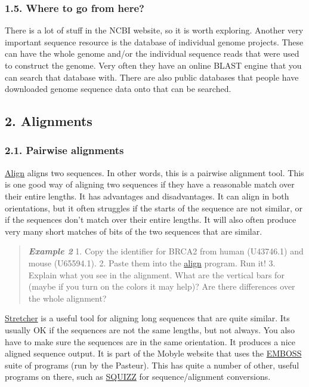 \documentclass[]{article}
\begin{document}
\subsubsection{1.5. Where to go from here?}\label{where-to-go-from-here}

There is a lot of stuff in the NCBI website, so it is worth exploring.
Another very important sequence resource is the database of individual
genome projects. These can have the whole genome and/or the individual
sequence reads that were used to construct the genome. Very often they
have an online BLAST engine that you can search that database with.
There are also public databases that people have downloaded genome
sequence data onto that can be searched.

\subsection{2. Alignments}\label{alignments}

\subsubsection{2.1. Pairwise alignments}\label{pairwise-alignments}

\href{http://blast.ncbi.nlm.nih.gov/Blast.cgi?PAGE_TYPE=BlastSearch\&BLAST_SPEC=blast2seq\&LINK_LOC=align2seq}{Align}
aligns two sequences. In other words, this is a pairwise alignment tool.
This is one good way of aligning two sequences if they have a reasonable
match over their entire lengths. It has advantages and disadvantages. It
can align in both orientations, but it often struggles if the starts of
the sequence are not similar, or if the sequences don't match over their
entire lengths. It will also often produce very many short matches of
bits of the two sequences that are similar.

\begin{quote}
\emph{\textbf{Example 2}} 1. Copy the identifier for BRCA2 from human
(U43746.1) and mouse (U65594.1). 2. Paste them into the
\href{http://blast.ncbi.nlm.nih.gov/Blast.cgi?PAGE_TYPE=BlastSearch\&BLAST_SPEC=blast2seq\&LINK_LOC=align2seq}{align}
program. Run it! 3. Explain what you see in the alignment. What are the
vertical bars for (maybe if you turn on the colors it may help)? Are
there differences over the whole alignment?
\end{quote}

\href{http://mobyle.pasteur.fr/cgi-bin/MobylePortal/portal.py?form=stretcher}{Stretcher}
is a useful tool for aligning long sequences that are quite similar. Its
usually OK if the sequences are not the same lengths, but not always.
You also have to make sure the sequences are in the same orientation. It
produces a nice aligned sequence output. It is part of the Mobyle
website that uses the \href{http://emboss.sourceforge.net/}{EMBOSS}
suite of programs (run by the Pasteur). This has quite a number of
other, useful programs on there, such as
\href{http://mobyle.pasteur.fr/cgi-bin/portal.py\#forms::squizz_convert}{SQUIZZ}
for sequence/alignment conversions.
\end{document}
